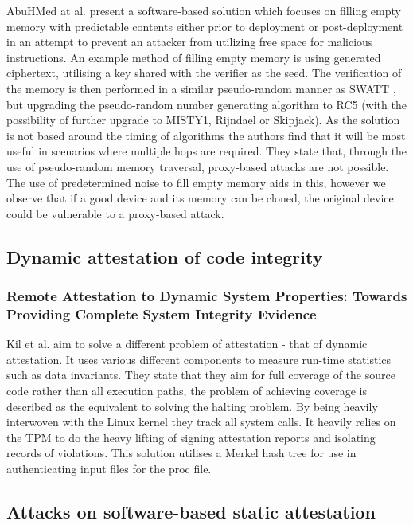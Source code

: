 AbuHMed at al. \cite{AbuHmed2009} present a software-based solution which focuses on filling empty memory with predictable contents either prior to deployment or post-deployment in an attempt to prevent an attacker from utilizing free space for malicious instructions. An example method of filling empty memory is using generated ciphertext, utilising a key shared with the verifier as the seed. The verification of the memory is then performed in a similar pseudo-random manner as SWATT \cite{Seshadri2004}, but upgrading the pseudo-random number generating algorithm to RC5 (with the possibility of further upgrade to MISTY1, Rijndael or Skipjack). As the solution is not based around the timing of algorithms the authors find that it will be most useful in scenarios where multiple hops are required. They state that, through the use of pseudo-random memory traversal, proxy-based attacks are not possible. The use of predetermined noise to fill empty memory aids in this, however we observe that if a good device and its memory can be cloned, the original device could be vulnerable to a proxy-based attack.

\subsection{Dynamic attestation of code integrity} \label{dynamicAttestationSolutions}

\subsubsection*{Remote Attestation to Dynamic System Properties: Towards Providing Complete System Integrity Evidence}

Kil et al. \cite{Kil2009} aim to solve a different problem of attestation - that of dynamic attestation. It uses various different components to measure run-time statistics such as data invariants. They state that they aim for full coverage of the source code rather than all execution paths, the problem of achieving coverage is described as the equivalent to solving the halting problem. By being heavily interwoven with the Linux kernel they track all system calls. It heavily relies on the TPM to do the heavy lifting of signing attestation reports and isolating records of violations. This solution utilises a Merkel hash tree for use in authenticating input files for the proc file.

\subsection{Attacks on software-based static attestation} \label{attestationSolutionsAttacks}


